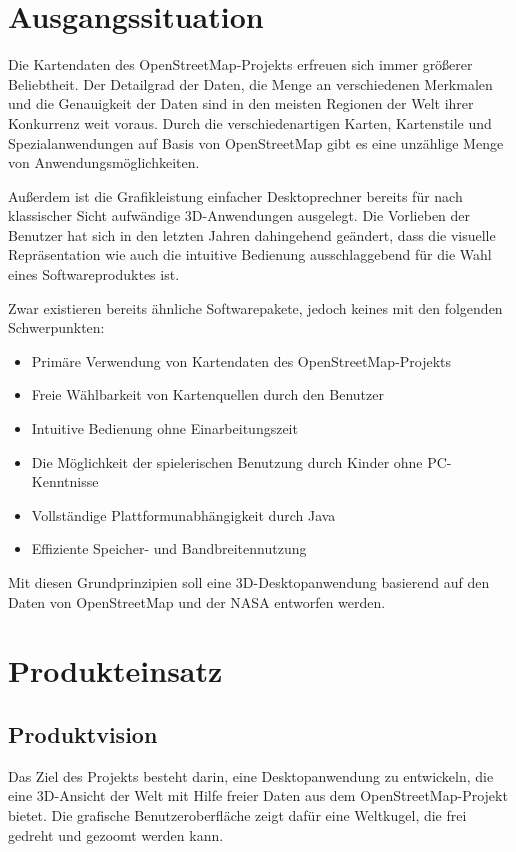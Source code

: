 \documentclass[10pt]{scrreprt}
\begin{document}
\rmfamily
\tableofcontents



\chapter{Ausgangssituation}
Die Kartendaten des OpenStreetMap-Projekts erfreuen sich immer größerer Beliebtheit. Der Detailgrad der Daten, die Menge an verschiedenen Merkmalen und die Genauigkeit der Daten sind in den meisten Regionen der Welt ihrer Konkurrenz weit voraus. Durch die verschiedenartigen Karten, Kartenstile und Spezialanwendungen auf Basis von OpenStreetMap gibt es eine unzählige Menge von Anwendungsmöglichkeiten.

Außerdem ist die Grafikleistung einfacher Desktoprechner bereits für nach klassischer Sicht aufwändige 3D-Anwendungen ausgelegt. Die Vorlieben der Benutzer hat sich in den letzten Jahren dahingehend geändert, dass die visuelle Repräsentation wie auch die intuitive Bedienung ausschlaggebend für die Wahl eines Softwareproduktes ist.

\vspace{0.5cm}

Zwar existieren bereits ähnliche Softwarepakete, jedoch keines mit den folgenden Schwerpunkten:
\begin{itemize}
\item Primäre Verwendung von Kartendaten des OpenStreetMap-Projekts
\item Freie Wählbarkeit von Kartenquellen durch den Benutzer
\item Intuitive Bedienung ohne Einarbeitungszeit
\item Die Möglichkeit der spielerischen Benutzung durch Kinder ohne PC-Kenntnisse
\item Vollständige Plattformunabhängigkeit durch Java
\item Effiziente Speicher- und Bandbreitennutzung
\end{itemize}

\vspace{0.5cm}

Mit diesen Grundprinzipien soll eine 3D-Desktopanwendung basierend auf den Daten von OpenStreetMap und der NASA entworfen werden.




\chapter{Produkteinsatz}
\section{Produktvision}
Das Ziel des Projekts besteht darin, eine Desktopanwendung zu entwickeln, die eine 3D-Ansicht der Welt mit Hilfe freier Daten aus dem OpenStreetMap-Projekt bietet. Die grafische Benutzeroberfläche zeigt dafür eine Weltkugel, die frei gedreht und gezoomt werden kann. 
\end{document}
